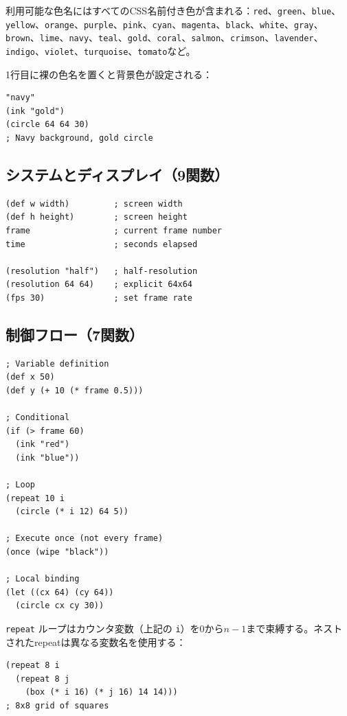 \documentclass[10pt,letterpaper,twocolumn]{article}
\begin{document}
利用可能な色名にはすべてのCSS名前付き色が含まれる：\texttt{red}、\texttt{green}、\texttt{blue}、\texttt{yellow}、\texttt{orange}、\texttt{purple}、\texttt{pink}、\texttt{cyan}、\texttt{magenta}、\texttt{black}、\texttt{white}、\texttt{gray}、\texttt{brown}、\texttt{lime}、\texttt{navy}、\texttt{teal}、\texttt{gold}、\texttt{coral}、\texttt{salmon}、\texttt{crimson}、\texttt{lavender}、\texttt{indigo}、\texttt{violet}、\texttt{turquoise}、\texttt{tomato}など。

1行目に裸の色名を置くと背景色が設定される：

\begin{lstlisting}
"navy"
(ink "gold")
(circle 64 64 30)
; Navy background, gold circle
\end{lstlisting}

\subsection{システムとディスプレイ（9関数）}

\begin{lstlisting}
(def w width)         ; screen width
(def h height)        ; screen height
frame                 ; current frame number
time                  ; seconds elapsed

(resolution "half")   ; half-resolution
(resolution 64 64)    ; explicit 64x64
(fps 30)              ; set frame rate
\end{lstlisting}

\subsection{制御フロー（7関数）}

\begin{lstlisting}
; Variable definition
(def x 50)
(def y (+ 10 (* frame 0.5)))

; Conditional
(if (> frame 60)
  (ink "red")
  (ink "blue"))

; Loop
(repeat 10 i
  (circle (* i 12) 64 5))

; Execute once (not every frame)
(once (wipe "black"))

; Local binding
(let ((cx 64) (cy 64))
  (circle cx cy 30))
\end{lstlisting}

\texttt{repeat} ループはカウンタ変数（上記の \texttt{i}）を0から$n-1$まで束縛する。ネストされたrepeatは異なる変数名を使用する：

\begin{lstlisting}
(repeat 8 i
  (repeat 8 j
    (box (* i 16) (* j 16) 14 14)))
; 8x8 grid of squares
\end{lstlisting}
\end{document}
